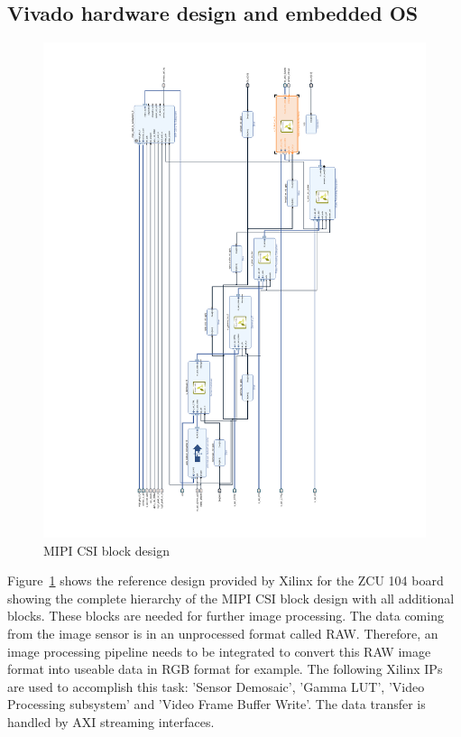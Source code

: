 \subsection{Vivado hardware design and embedded \acs{OS}}
\begin{figure}[!htb]
	\centering
		\includegraphics[width=\textwidth]{bilder/mipi_csi2_rx.pdf}
		\caption{\acs{MIPI} \acs{CSI} block design}
		\label{fig:mipi_block}
\end{figure}
Figure~\ref{fig:mipi_block} shows the reference design provided by Xilinx for the ZCU 104 board showing the complete hierarchy of the \ac{MIPI} \ac{CSI} block design with all additional blocks. These blocks are needed for further image processing. The data coming from the image sensor is in an unprocessed format called RAW. Therefore, an image processing pipeline needs to be integrated to convert this RAW image format into useable data in RGB format for example. The following Xilinx \acp{IP} are used to accomplish this task: 'Sensor Demosaic', 'Gamma LUT', 'Video Processing subsystem' and 'Video Frame Buffer Write'. The data transfer is handled by \ac{AXI} streaming interfaces.

